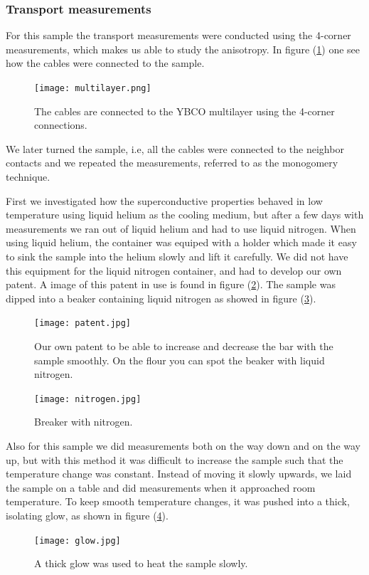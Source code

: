 \documentclass{comjnl}
\begin{document}
\subsubsection{Transport measurements}
For this sample the transport measurements were conducted using the 4-corner measurements, which makes us able to study the anisotropy. In figure (\ref{fig:multilayer}) one see how the cables were connected to the sample.
\begin{figure}[h]
\centering
\texttt{[image: multilayer.png]}
\caption{The cables are connected to the YBCO multilayer using the 4-corner connections. \label{fig:multilayer}}
\end{figure}
We later turned the sample, i.e, all the cables were connected to the neighbor contacts and we repeated the measurements, referred to as the monogomery technique. 

First we investigated how the superconductive properties behaved in low temperature using liquid helium as the cooling medium, but after a few days with measurements we ran out of liquid helium and had to use liquid nitrogen. When using liquid helium, the container was equiped with a holder which made it easy to sink the sample into the helium slowly and lift it carefully. We did not have this equipment for the liquid nitrogen container, and had to develop our own patent. A image of this patent in use is found in figure (\ref{fig:patent}). The sample was dipped into a beaker containing liquid nitrogen as showed in figure (\ref{fig:nitrogen}). 
\begin{figure}[h]
\centering
\texttt{[image: patent.jpg]}
\caption{Our own patent to be able to increase and decrease the bar with the sample smoothly. On the flour you can spot the beaker with liquid nitrogen. \label{fig:patent}}
\end{figure}
\begin{figure}[h]
\centering
\texttt{[image: nitrogen.jpg]}
\caption{Breaker with nitrogen. \label{fig:nitrogen}}
\end{figure}
Also for this sample we did measurements both on the way down and on the way up, but with this method it was difficult to increase the sample such that the temperature change was constant. Instead of moving it slowly upwards, we laid the sample on a table and did measurements when it approached room temperature. To keep smooth temperature changes, it was pushed into a thick, isolating glow, as shown in figure (\ref{fig:glow}).
\begin{figure}[h]
\centering
\texttt{[image: glow.jpg]}
\caption{A thick glow was used to heat the sample slowly. \label{fig:glow}}
\end{figure}
\end{document}
